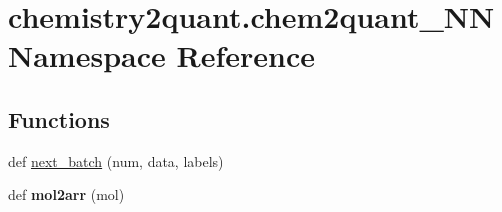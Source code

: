 \hypertarget{namespacechemistry2quant_1_1chem2quant__NN}{}\section{chemistry2quant.\+chem2quant\+\_\+\+NN Namespace Reference}
\label{namespacechemistry2quant_1_1chem2quant__NN}
\subsection*{Functions}
\begin{DoxyCompactItemize}
\item
def \hyperlink{namespacechemistry2quant_1_1chem2quant__NN_afb055d34a228ae670b94588087aa897e}{next\+\_\+batch} (num, data, labels)
\item
\mbox{\label{namespacechemistry2quant_1_1chem2quant__NN_a2c65dfd32b269c8366de91ed1f094dda}}
def {\bfseries mol2arr} (mol)
\end{DoxyCompactItemize}
